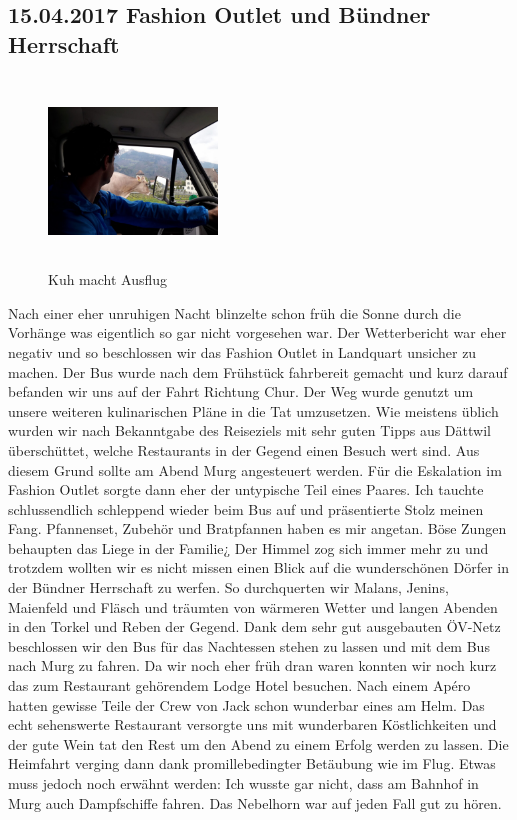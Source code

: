 \subsection{15.04.2017 Fashion Outlet und Bündner Herrschaft}

\begin{figure} 
  \begin{centering}
    \includegraphics[width=0.4\textwidth, height=5cm, keepaspectratio]{../Bilder/Walensee/28.jpg}
    \caption{Kuh macht Ausflug}
  \end{centering}
\end{figure}

Nach einer eher unruhigen Nacht blinzelte schon früh die Sonne durch die Vorhänge was eigentlich so gar nicht vorgesehen war.
Der Wetterbericht war eher negativ und so beschlossen wir das  Fashion Outlet in Landquart unsicher zu machen.
Der Bus wurde nach dem Frühstück fahrbereit gemacht und kurz darauf befanden wir uns auf der Fahrt Richtung Chur.
Der Weg wurde genutzt um unsere weiteren kulinarischen Pläne in die Tat umzusetzen.
Wie meistens üblich wurden wir nach Bekanntgabe des Reiseziels mit sehr guten Tipps aus Dättwil überschüttet, welche Restaurants in der Gegend einen Besuch wert sind.
Aus diesem Grund sollte am Abend Murg angesteuert werden. 
Für die Eskalation im Fashion Outlet sorgte dann eher der untypische Teil eines Paares.
Ich tauchte schlussendlich schleppend wieder beim Bus auf und präsentierte Stolz meinen Fang.
Pfannenset, Zubehör und Bratpfannen haben es mir angetan.
Böse Zungen behaupten das Liege in der Familie¿
Der Himmel zog sich immer mehr zu und trotzdem wollten wir es nicht missen einen Blick auf die wunderschönen Dörfer in der Bündner Herrschaft zu werfen.
So durchquerten wir Malans, Jenins, Maienfeld und Fläsch und träumten von wärmeren Wetter und langen Abenden in den Torkel und Reben der Gegend. 
Dank dem sehr gut ausgebauten ÖV-Netz beschlossen wir den Bus für das Nachtessen stehen zu lassen und mit dem Bus nach Murg zu fahren.
Da wir noch eher früh dran waren konnten wir noch kurz das zum Restaurant gehörendem Lodge Hotel besuchen.
Nach einem Apéro hatten gewisse Teile der Crew von Jack schon wunderbar eines am Helm.
Das echt sehenswerte Restaurant versorgte uns mit wunderbaren Köstlichkeiten und der gute Wein tat den Rest  um den Abend zu einem Erfolg werden zu lassen.
Die Heimfahrt verging dann dank promillebedingter Betäubung wie im Flug.
Etwas muss jedoch noch erwähnt werden: Ich wusste gar nicht, dass am Bahnhof in Murg auch Dampfschiffe fahren.
Das Nebelhorn war auf jeden Fall gut zu hören.

